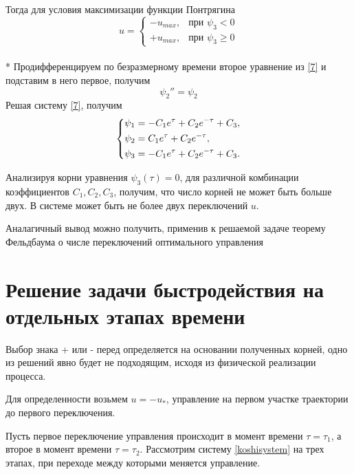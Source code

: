 \documentclass[a4paper,12pt, openany]{book}
\theoremstyle{plain} %
\theoremstyle{definition} %
\theoremstyle{remark} %
\numberwithin{equation}{chapter}
\begin{document}
{Тогда для условия максимизации функции Понтрягина
\[
    u=
    \begin{cases}
        -u_{max}, & \text{при $\psi_3<0$}          \\
        +u_{max}, & \text{при $\psi_3\geqslant 0$}
    \end{cases}
\]\\*
Продифференцируем по безразмерному времени второе уравнение из \eqref{7} и подставим в него первое, получим
\[
    \psi_2 ''=\psi_2
\]
Решая систему \eqref{7}, получим
\[
    \left\{ {\begin{aligned}
                 & \psi_1 = -C_1e^\tau+C_2e^{-\tau}+C_3, \hfill  \\
                 & \psi_2 = C_1e^\tau+C_2e^{-\tau} , \hfill      \\
                 & \psi_3 = -C_1e^\tau+C_2e^{-\tau}+C_3 . \hfill \\
            \end{aligned}} \right.
\]

Анализируя корни уравнения $\psi_3(\tau)=0$, для различной комбинации
коэффициентов $C_1,C_2,C_3$, получим, что число корней не может быть больше двух. В системе может быть не более двух переключений $u$.

Аналагичный вывод можно получить, применив к решаемой задаче теорему Фельдбаума о числе переключений оптимального управления\cite{feldbaum}



\section{Решение задачи быстродействия на отдельных этапах времени}
Выбор знака + или - перед определяется на основании полученных корней,
одно из решений явно будет не подходящим, исходя из физической реализации процесса.

Для определенности возьмем $u=-u_\ast$, управление на первом участке траектории до первого переключения.

Пусть первое переключение управления происходит в момент времени
$\tau=\tau_1$, а второе в момент времени
$\tau=\tau_2$. Рассмотрим систему \eqref{koshisystem} на трех этапах,
при переходе между которыми меняется управление.

}
\end{document}
